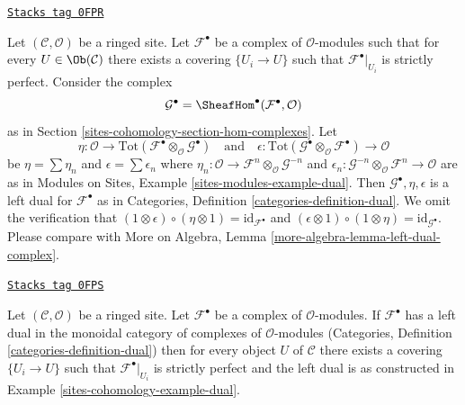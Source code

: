 \begin{example}[Dual]
\label{sites-cohomology-example-dual}
\href{https://stacks.math.columbia.edu/tag/0FPR}{\texttt{Stacks tag 0FPR}}

Let $(\mathcal{C}, \mathcal{O})$ be a ringed site. Let $\mathcal{F}^\bullet$
be a complex of $\mathcal{O}$-modules such that for every
$U \in \Ob(\mathcal{C})$ there exists a covering $\{U_i \to U\}$
such that $\mathcal{F}^\bullet|_{U_i}$ is strictly perfect.
Consider the complex
$$
\mathcal{G}^\bullet = \SheafHom^\bullet(\mathcal{F}^\bullet, \mathcal{O})
$$
as in Section \ref{sites-cohomology-section-hom-complexes}. Let
$$
\eta :
\mathcal{O}
\to
\text{Tot}(\mathcal{F}^\bullet \otimes_\mathcal{O} \mathcal{G}^\bullet)
\quad\text{and}\quad
\epsilon :
\text{Tot}(\mathcal{G}^\bullet \otimes_\mathcal{O} \mathcal{F}^\bullet)
\to
\mathcal{O}
$$
be $\eta = \sum \eta_n$ and $\epsilon = \sum \epsilon_n$
where $\eta_n : \mathcal{O} \to
\mathcal{F}^n \otimes_\mathcal{O} \mathcal{G}^{-n}$
and
$\epsilon_n : \mathcal{G}^{-n} \otimes_\mathcal{O} \mathcal{F}^n
\to \mathcal{O}$ are as in
Modules on Sites, Example \ref{sites-modules-example-dual}.
Then $\mathcal{G}^\bullet, \eta, \epsilon$
is a left dual for $\mathcal{F}^\bullet$ as in
Categories, Definition \ref{categories-definition-dual}.
We omit the verification that
$(1 \otimes \epsilon) \circ (\eta \otimes 1) = \text{id}_{\mathcal{F}^\bullet}$
and
$(\epsilon \otimes 1) \circ (1 \otimes \eta) =
\text{id}_{\mathcal{G}^\bullet}$. Please compare with
More on Algebra, Lemma \ref{more-algebra-lemma-left-dual-complex}.
\end{example}

\begin{lemma}
\label{sites-cohomology-lemma-left-dual-complex}
\href{https://stacks.math.columbia.edu/tag/0FPS}{\texttt{Stacks tag 0FPS}}

Let $(\mathcal{C}, \mathcal{O})$ be a ringed site. Let $\mathcal{F}^\bullet$
be a complex of $\mathcal{O}$-modules. If $\mathcal{F}^\bullet$
has a left dual in the monoidal category of complexes of
$\mathcal{O}$-modules
(Categories, Definition \ref{categories-definition-dual})
then for every object $U$ of $\mathcal{C}$ there exists a
covering $\{U_i \to U\}$ such that $\mathcal{F}^\bullet|_{U_i}$
is strictly perfect and the left dual is as constructed in
Example \ref{sites-cohomology-example-dual}.
\end{lemma}


